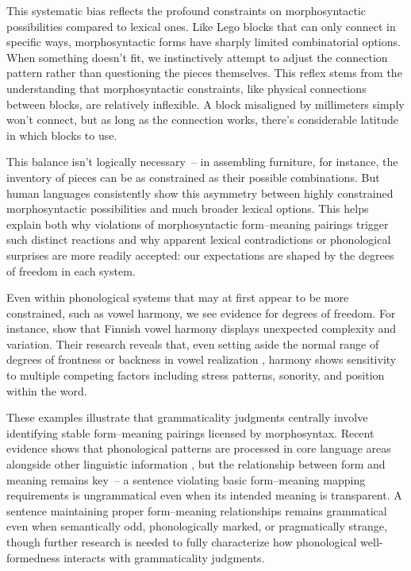 This systematic bias reflects the profound constraints on morphosyntactic possibilities compared to lexical ones. Like Lego blocks that can only connect in specific ways, morphosyntactic forms have sharply limited combinatorial options. When something doesn't fit, we instinctively attempt to adjust the connection pattern rather than questioning the pieces themselves. This reflex stems from the understanding that morphosyntactic constraints, like physical connections between blocks, are relatively inflexible. A block misaligned by millimeters simply won't connect, but as long as the connection works, there's considerable latitude in which blocks to use.

This balance isn't logically necessary~-- in assembling furniture, for instance, the inventory of pieces can be as constrained as their possible combinations. But human languages consistently show this asymmetry between highly constrained morphosyntactic possibilities and much broader lexical options. This helps explain both why violations of morphosyntactic form--meaning pairings trigger such distinct reactions and why apparent lexical contradictions or phonological surprises are more readily accepted: our expectations are shaped by the degrees of freedom in each system.

Even within phonological systems that may at first appear to be more constrained, such as vowel harmony, we see evidence for degrees of freedom. For instance, \textcite{Ringen1999} show that Finnish vowel harmony displays unexpected complexity and variation. Their research reveals that, even setting aside the normal range of degrees of frontness or backness in vowel realization \autocite{Duncan2008, Lennes2003}, harmony shows sensitivity to multiple competing factors including stress patterns, sonority, and position within the word.

\bigskip
These examples illustrate that grammaticality judgments centrally involve identifying stable form--meaning pairings licensed by morphosyntax. Recent evidence shows that phonological patterns are processed in core language areas alongside other linguistic information \autocite{Regev2024}, but the relationship between form and meaning remains key~-- a sentence violating basic form--meaning mapping requirements is ungrammatical even when its intended meaning is transparent. A sentence maintaining proper form--meaning relationships remains grammatical even when semantically odd, phonologically marked, or pragmatically strange, though further research is needed to fully characterize how phonological well-formedness interacts with grammaticality judgments. 

